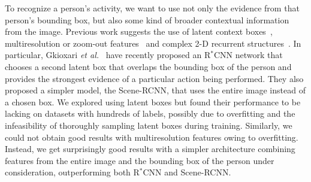 \documentclass[runningheads]{llncs}
\begin{document}
To recognize a person's activity, we want to use not only the evidence from that person's bounding box, but also some kind of broader contextual information from the image. Previous work suggests the use of latent context boxes~\cite{gkioxari2015rstarcnn}, multiresolution or zoom-out features~\cite{bell2015InsideOutside,mostajabi2015feedforward} and complex 2-D recurrent structures~\cite{bell2015InsideOutside}. In particular, Gkioxari \emph{et al.}~\cite{gkioxari2015rstarcnn} have recently proposed an R$^*$CNN network that chooses a second latent box that overlaps the bounding box of the person and provides the strongest evidence of a particular action being performed. They also proposed a simpler model, the Scene-RCNN, that uses the entire image instead of a chosen box.
We explored using latent boxes but found their performance to be lacking on datasets with hundreds of labels, possibly due to overfitting and the infeasibility of thoroughly sampling latent boxes during training. Similarly, we could not obtain good results with multiresolution features owing to overfitting. Instead, we get surprisingly good results with a simpler architecture combining features from the entire image and the bounding box of the person under consideration, outperforming both R$^*$CNN and Scene-RCNN. 
\end{document}
